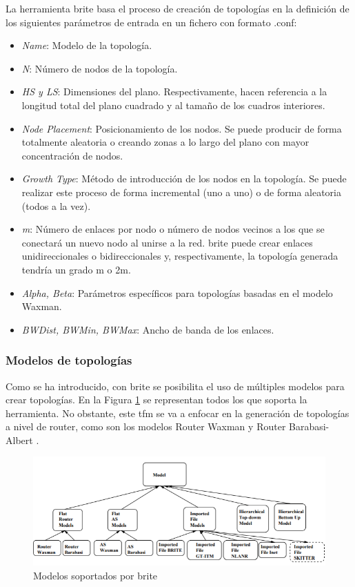 La herramienta \gls{brite} basa el proceso de creación de topologías en la definición de los siguientes parámetros de entrada en un fichero con formato .conf:

\begin{itemize}
    \item \textit{Name}: Modelo de la topología.
    \item \textit{N}: Número de nodos de la topología.  
    \item \textit{HS y LS}: Dimensiones del plano. Respectivamente, hacen referencia a la longitud total del plano cuadrado y al tamaño de los cuadros interiores.
    \item \textit{Node Placement}: Posicionamiento de los nodos. Se puede producir de forma totalmente aleatoria o creando zonas a lo largo del plano con mayor concentración de nodos. 
    \item \textit{Growth Type}: Método de introducción de los nodos en la topología. Se puede realizar este proceso de forma incremental (uno a uno) o de forma aleatoria (todos a la vez). 
    \item \textit{m}: Número de enlaces por nodo o número de nodos vecinos a los que se conectará un nuevo nodo al unirse a la red. \gls{brite} puede crear enlaces unidireccionales o bidireccionales y, respectivamente, la topología generada tendría un grado m o 2m.
    \item \textit{Alpha, Beta}: Parámetros específicos para topologías basadas en el modelo Waxman.
    \item \textit{BWDist, BWMin, BWMax}: Ancho de banda de los enlaces.
\end{itemize}

\subsubsection{Modelos de topologías}
\label{sec:modelostopos}

Como se ha introducido, con \gls{brite} se posibilita el uso de múltiples modelos para crear topologías. En la Figura \ref{fig:brite} se representan todos los que soporta la herramienta. No obstante, este \gls{tfm} se va a enfocar en la generación de topologías a nivel de router, como son los modelos Router Waxman \cite{waxman} y Router Barabasi-Albert \cite{barabasi}. 

\vspace{3mm}

\begin{figure}[h!]
    \centering
    \includegraphics[width=1\textwidth]{img/teoria/brite.PNG}
    \caption{Modelos soportados por \acrshort{brite} \cite{brite}}
    \label{fig:brite}
\end{figure}

